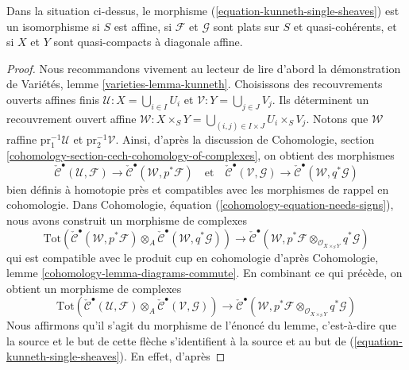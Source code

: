 \begin{lemma}
\label{lemma-kunneth-single-sheaf}
Dans la situation ci-dessus, le morphisme (\ref{equation-kunneth-single-sheaves}) est un
isomorphisme si $S$ est affine, si $\mathcal{F}$ et $\mathcal{G}$ sont plats sur $S$ et
quasi-cohérents, et si $X$ et $Y$ sont quasi-compacts à diagonale affine.
\end{lemma}

\begin{proof}
Nous recommandons vivement au lecteur de lire d'abord la démonstration de
Variétés, lemme \ref{varieties-lemma-kunneth}.
Choisissons des recouvrements ouverts affines finis
$\mathcal{U} : X = \bigcup_{i \in I} U_i$ et
$\mathcal{V} : Y = \bigcup_{j \in J} V_j$.
Ils déterminent un recouvrement ouvert affine
$\mathcal{W} : X \times_S Y = \bigcup_{(i, j) \in I \times J} U_i \times_S V_j$.
Notons que $\mathcal{W}$ raffine
$\text{pr}_1^{-1}\mathcal{U}$ et $\text{pr}_2^{-1}\mathcal{V}$.
Ainsi, d'après la discussion de Cohomologie, section
\ref{cohomology-section-cech-cohomology-of-complexes},
on obtient des morphismes
$$
\check{\mathcal{C}}^\bullet(\mathcal{U}, \mathcal{F})
\to
\check{\mathcal{C}}^\bullet(\mathcal{W}, p^*\mathcal{F})
\quad\text{et}\quad
\check{\mathcal{C}}^\bullet(\mathcal{V}, \mathcal{G})
\to
\check{\mathcal{C}}^\bullet(\mathcal{W}, q^*\mathcal{G})
$$
bien définis à homotopie près et compatibles avec les morphismes de rappel en cohomologie.
Dans Cohomologie, équation (\ref{cohomology-equation-needs-signs}),
nous avons construit un morphisme de complexes
$$
\text{Tot}(
\check{\mathcal{C}}^\bullet(\mathcal{W}, p^*\mathcal{F})
\otimes_A
\check{\mathcal{C}}^\bullet(\mathcal{W}, q^*\mathcal{G}))
\longrightarrow
\check{\mathcal{C}}^\bullet(\mathcal{W},
p^*\mathcal{F} \otimes_{\mathcal{O}_{X \times_S Y}}
q^*\mathcal{G})
$$
qui est compatible avec le produit cup en cohomologie d'après
Cohomologie, lemme \ref{cohomology-lemma-diagrams-commute}.
En combinant ce qui précède, on obtient un morphisme de complexes
\begin{equation}
\label{equation-kunneth-on-cech}
\text{Tot}(
\check{\mathcal{C}}^\bullet(\mathcal{U}, \mathcal{F})
\otimes_A
\check{\mathcal{C}}^\bullet(\mathcal{V}, \mathcal{G}))
\to
\check{\mathcal{C}}^\bullet(\mathcal{W},
p^*\mathcal{F}
\otimes_{\mathcal{O}_{X \times_S Y}}
q^*\mathcal{G})
\end{equation}
Nous affirmons qu'il s'agit du morphisme de l'énoncé du lemme, c'est-à-dire que
la source et le but de cette flèche s'identifient à la source
et au but de (\ref{equation-kunneth-single-sheaves}). En effet, d'après

\end{proof}
